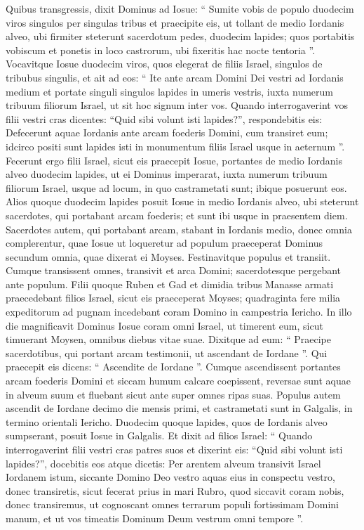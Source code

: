 \begin{biblechapter}
\begin{biblechapter}
\begin{biblechapter}
\begin{biblechapter}
\verse Quibus transgressis, dixit Dominus ad Iosue: 
\verse “ Sumite vobis de populo duodecim viros singulos per singulas tribus 
\verse et praecipite eis, ut tollant de medio Iordanis alveo, ubi firmiter steterunt sacerdotum pedes, duodecim lapides; quos portabitis vobiscum et ponetis in loco castrorum, ubi fixeritis hac nocte tentoria ”.
 \verse Vocavitque Iosue duodecim viros, quos elegerat de filiis Israel, singulos de tribubus singulis, 
\verse et ait ad eos: “ Ite ante arcam Domini Dei vestri ad Iordanis medium et portate singuli singulos lapides in umeris vestris, iuxta numerum tribuum filiorum Israel, 
\verse ut sit hoc signum inter vos. Quando interrogaverint vos filii vestri cras dicentes: “Quid sibi volunt isti lapides?”, 
\verse respondebitis eis: Defecerunt aquae Iordanis ante arcam foederis Domini, cum transiret eum; idcirco positi sunt lapides isti in monumentum filiis Israel usque in aeternum ”.
 \verse Fecerunt ergo filii Israel, sicut eis praecepit Iosue, portantes de medio Iordanis alveo duodecim lapides, ut ei Dominus imperarat, iuxta numerum tribuum filiorum Israel, usque ad locum, in quo castrametati sunt; ibique posuerunt eos. 
\verse Alios quoque duodecim lapides posuit Iosue in medio Iordanis alveo, ubi steterunt sacerdotes, qui portabant arcam foederis; et sunt ibi usque in praesentem diem. 
\verse Sacerdotes autem, qui portabant arcam, stabant in Iordanis medio, donec omnia complerentur, quae Iosue ut loqueretur ad populum praeceperat Dominus secundum omnia, quae dixerat ei Moyses. Festinavitque populus et transiit. 
\verse Cumque transissent omnes, transivit et arca Domini; sacerdotesque pergebant ante populum. 
\verse Filii quoque Ruben et Gad et dimidia tribus Manasse armati praecedebant filios Israel, sicut eis praeceperat Moyses; 
\verse quadraginta fere milia expeditorum ad pugnam incedebant coram Domino in campestria Iericho.
 \verse In illo die magnificavit Dominus Iosue coram omni Israel, ut timerent eum, sicut timuerant Moysen, omnibus diebus vitae suae. 
\verse Dixitque ad eum: 
 \verse “ Praecipe sacerdotibus, qui portant arcam testimonii, ut ascendant de Iordane ”. 
\verse Qui praecepit eis dicens: “ Ascendite de Iordane ”. 
\verse Cumque ascendissent portantes arcam foederis Domini et siccam humum calcare coepissent, reversae sunt aquae in alveum suum et fluebant sicut ante super omnes ripas suas.
 \verse Populus autem ascendit de Iordane decimo die mensis primi, et castrametati sunt in Galgalis, in termino orientali Iericho. 
\verse Duodecim quoque lapides, quos de Iordanis alveo sumpserant, posuit Iosue in Galgalis. 
\verse Et dixit ad filios Israel: “ Quando interrogaverint filii vestri cras patres suos et dixerint eis: “Quid sibi volunt isti lapides?”, 
\verse docebitis eos atque dicetis: Per arentem alveum transivit Israel Iordanem istum, 
\verse siccante Domino Deo vestro aquas eius in conspectu vestro, donec transiretis, 
\verse sicut fecerat prius in mari Rubro, quod siccavit coram nobis, donec transiremus, 
 \verse ut cognoscant omnes terrarum populi fortissimam Domini manum, et ut vos timeatis Dominum Deum vestrum omni tempore ”.
 

\end{biblechapter}
\end{biblechapter}
\end{biblechapter}
\end{biblechapter}
